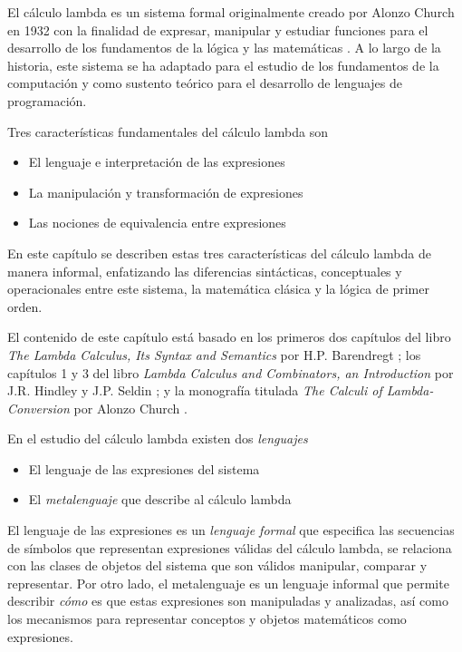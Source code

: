 El cálculo lambda es un sistema formal originalmente creado por Alonzo Church en 1932 con la finalidad de expresar, manipular y estudiar funciones para el desarrollo de los fundamentos de la lógica y las matemáticas \cite[p.~248]{Church:FoundationsLogic}. A lo largo de la historia, este sistema se ha adaptado para el estudio de los fundamentos de la computación y como sustento teórico para el desarrollo de lenguajes de programación.

Tres características fundamentales del cálculo lambda son

\begin{itemize}
\item El lenguaje e interpretación de las expresiones
\item La manipulación y transformación de expresiones
\item Las nociones de equivalencia entre expresiones
\end{itemize}

En este capítulo se describen estas tres características del cálculo lambda de manera informal, enfatizando las diferencias sintácticas, conceptuales y operacionales entre este sistema, la matemática clásica y la lógica de primer orden.

El contenido de este capítulo está basado en los primeros dos capítulos del libro \emph{The Lambda Calculus, Its Syntax and Semantics} por H.P. Barendregt \cite{Barendregt:Bible}; los capítulos 1 y 3 del libro \emph{Lambda Calculus and Combinators, an Introduction} por J.R. Hindley y J.P. Seldin \cite{HindleySeldin:LambdaCalculusAndCombinators}; y la monografía titulada \emph{The Calculi of Lambda-Conversion} por Alonzo Church \cite{Church:LambdaConversion}.

En el estudio del cálculo lambda existen dos \emph{lenguajes}

\begin{itemize}
\item El lenguaje de las expresiones del sistema
\item El \emph{metalenguaje} que describe al cálculo lambda
\end{itemize}

El lenguaje de las expresiones es un \emph{lenguaje formal} que especifica las secuencias de símbolos que representan expresiones válidas del cálculo lambda, se relaciona con las clases de objetos del sistema que son válidos manipular, comparar y representar. Por otro lado, el metalenguaje es un lenguaje informal que permite describir \emph{cómo} es que estas expresiones son manipuladas y analizadas, así como los mecanismos para representar conceptos y objetos matemáticos como expresiones.

